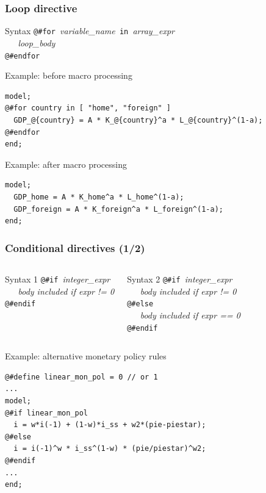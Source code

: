 \documentclass{beamer}
\begin{document}
\begin{frame}[fragile=singleslide]
  \frametitle{Loop directive}
  \begin{block}{Syntax}
\verb+@#for +\textit{variable\_name}\verb+ in +\textit{array\_expr} \\
\verb+   +\textit{loop\_body} \\
\verb+@#endfor+
  \end{block}
  \begin{block}{Example: before macro processing}
    \small
\begin{verbatim}
model;
@#for country in [ "home", "foreign" ]
  GDP_@{country} = A * K_@{country}^a * L_@{country}^(1-a);
@#endfor
end;
\end{verbatim}
    \normalsize
  \end{block}

  \begin{block}{Example: after macro processing}
    \small
\begin{verbatim}
model;
  GDP_home = A * K_home^a * L_home^(1-a);
  GDP_foreign = A * K_foreign^a * L_foreign^(1-a);
end;
\end{verbatim}
    \normalsize
  \end{block}
\end{frame}

\begin{frame}[fragile=singleslide]
  \frametitle{Conditional directives (1/2)}

  \begin{columns}[T]
    \begin{block}{Syntax 1}
\verb+@#if +\textit{integer\_expr} \\
\verb+   +\textit{body included if expr != 0} \\
\verb+@#endif+
    \end{block}

    \begin{block}{Syntax 2}
\verb+@#if +\textit{integer\_expr} \\
\verb+   +\textit{body included if expr != 0} \\
\verb+@#else+ \\
\verb+   +\textit{body included if expr == 0} \\
\verb+@#endif+
    \end{block}
  \end{columns}

  \begin{block}{Example: alternative monetary policy rules}
    \scriptsize
\begin{verbatim}
@#define linear_mon_pol = 0 // or 1
...
model;
@#if linear_mon_pol
  i = w*i(-1) + (1-w)*i_ss + w2*(pie-piestar);
@#else
  i = i(-1)^w * i_ss^(1-w) * (pie/piestar)^w2;
@#endif
...
end;
\end{verbatim}
    \scriptsize
  \end{block}
\end{frame}
\end{document}
